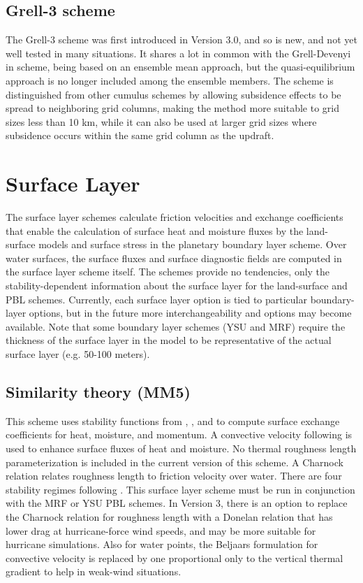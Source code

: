 \subsection{Grell-3 scheme}

The Grell-3 scheme was first introduced in Version 3.0, and so is
new, and not yet well tested in many situations. It shares a lot in
common with the Grell-Devenyi in scheme, being based on an ensemble mean
approach, but the quasi-equilibrium approach is no longer included
among the ensemble members. The scheme is distinguished from other
cumulus schemes by allowing subsidence effects to be spread to
neighboring grid columns, making the method more suitable to grid sizes
less than 10 km, while it can also be used at larger grid sizes where
subsidence occurs within the same grid column as the updraft. 

\section{Surface Layer}

The surface layer schemes calculate friction velocities and exchange 
coefficients that enable the calculation of surface heat and moisture 
fluxes by the land-surface models and surface stress in the planetary 
boundary layer scheme. Over water surfaces, the surface fluxes and surface 
diagnostic fields are computed in the surface layer scheme itself. The schemes 
provide no tendencies, only the stability-dependent information about 
the surface layer for the land-surface and PBL schemes.
Currently, each surface layer option is tied to particular boundary-layer
options, but in the future more interchangeability and options may become
available. Note that some boundary layer schemes (YSU and MRF) require
the thickness of the surface layer in the model to be representative of the
actual surface layer (e.g. 50-100 meters).

\subsection{Similarity theory (MM5)}

This scheme uses stability functions from \citet{paulson70}, \citet{dyer70}, 
and \citet{webb70}
to compute surface exchange coefficients for heat, moisture, and momentum. 
A convective velocity following \citet{beljaars94} is used to enhance surface 
fluxes of heat and moisture. No thermal roughness length parameterization is 
included in the current version of this scheme. A Charnock relation relates 
roughness length to friction velocity over water. There are four stability 
regimes following \citet{zhanganthes82}.
This surface layer scheme must be run in conjunction with the MRF or
YSU PBL schemes. In Version 3, there is an option to replace the Charnock
relation for roughness length with a Donelan relation that has lower
drag at hurricane-force wind speeds, and may be more suitable for hurricane
simulations. Also for water points, the Beljaars formulation for convective
velocity is replaced by one proportional only to the vertical thermal gradient
to help in weak-wind situations.

